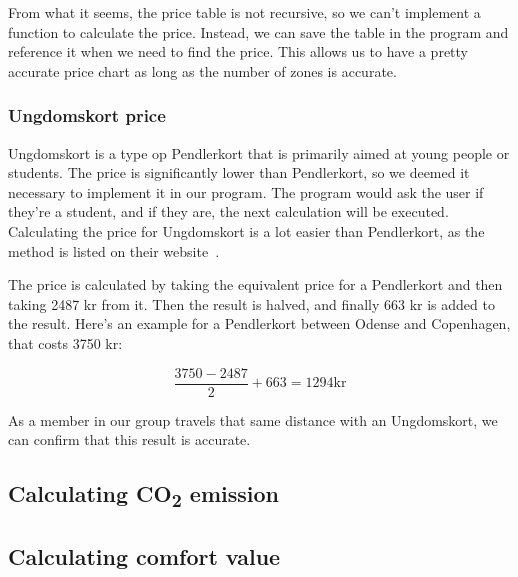 From what it seems, the price table is not recursive, so we can't implement a function to calculate the price.
Instead, we can save the table in the program and reference it when we need to find the price.
This allows us to have a pretty accurate price chart as long as the number of zones is accurate.

\subsubsection{Ungdomskort price}

Ungdomskort is a type op Pendlerkort that is primarily aimed at young people or students.
The price is significantly lower than Pendlerkort, so we deemed it necessary to implement it in our program.
The program would ask the user if they're a student, and if they are, the next calculation will be executed.
Calculating the price for Ungdomskort is a lot easier than Pendlerkort, as the method is listed on their
website~\cite{price_ung}.

The price is calculated by taking the equivalent price for a Pendlerkort and then taking 2487 kr from it.
Then the result is halved, and finally 663 kr is added to the result.
Here's an example for a Pendlerkort between Odense and Copenhagen, that costs 3750 kr:

\begin{equation}
    \frac{3750 - 2487}{2} + 663 = 1294 \text{kr}
\end{equation}

As a member in our group travels that same distance with an Ungdomskort, we can confirm that this result is accurate.

\subsection{Calculating \unit{CO_{2}} emission}\label{subsec:calculating-co2-emission}

\subsection{Calculating comfort value}\label{subsec:calculating-comfort-value}
